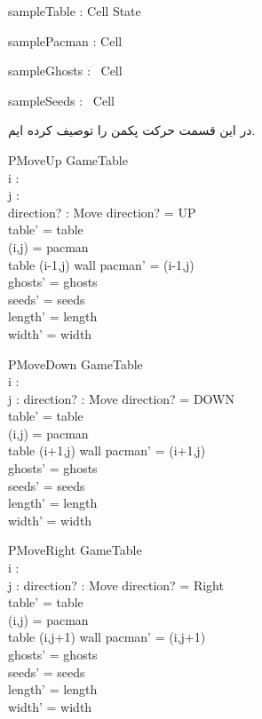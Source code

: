 \documentclass{article}
\begin{document}
\begin{axdef}
sampleTable : Cell \fun State
\end{axdef}

\begin{axdef}
samplePacman : Cell 
\end{axdef}

\begin{axdef}
sampleGhosts : \power~Cell 
\end{axdef}

\begin{axdef}
sampleSeeds : \power~Cell 
\end{axdef}

در این قسمت حرکت پکمن را توصیف کرده ایم.

\begin{schema}{PMoveUp}
\Delta GameTable\\
i : \nat\\
j : \nat\\
direction? : Move
\where
direction? = UP\\
table' = table\\
(i,j) = pacman\\
table (i-1,j) \neq wall
pacman' = (i-1,j)\\
ghosts' = ghosts\\
seeds' = seeds\\
length' = length\\
width' = width 
\end{schema}

\begin{schema}{PMoveDown}
\Delta GameTable\\
i : \nat\\
j : \nat
direction? : Move
\where
direction? = DOWN\\
table' = table\\
(i,j) = pacman\\
table (i+1,j) \neq wall
pacman' = (i+1,j)\\
ghosts' = ghosts\\
seeds' = seeds\\
length' = length\\
width' = width 
\end{schema}

\begin{schema}{PMoveRight}
\Delta GameTable\\
i : \nat\\
j : \nat
direction? : Move
\where
direction? = Right\\
table' = table\\
(i,j) = pacman\\
table (i,j+1) \neq wall
pacman' = (i,j+1)\\
ghosts' = ghosts\\
seeds' = seeds\\
length' = length\\
width' = width 
\end{schema}
\end{document}

